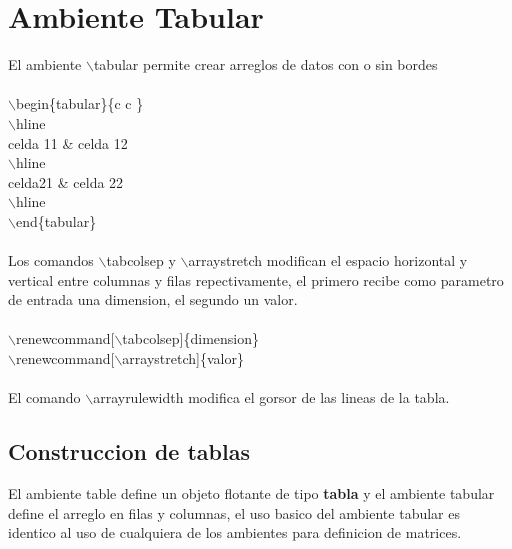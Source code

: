 \documentclass{article}
\begin{document}
	\section{Ambiente Tabular}
	
	El ambiente \textcolor{myGreen}{$\backslash$tabular} permite crear arreglos de datos con o sin bordes\\\\
	\textcolor{myGreen}{$\backslash$begin}\{tabular\}\{\textbar c \textbar c \textbar\}\\\textcolor{myGreen}{$\backslash$hline}\\
	celda 11 \& celda 12\\
	\textcolor{myGreen}{$\backslash$hline}\\
	celda21 \& celda 22\\
	\textcolor{myGreen}{$\backslash$hline}\\
	\textcolor{myGreen}{$\backslash$end}\{tabular\}\\\\
	Los comandos \textcolor{myGreen}{$\backslash$tabcolsep} y \textcolor{myGreen}{$\backslash$arraystretch} modifican el espacio horizontal y vertical entre columnas y filas repectivamente, el primero recibe como parametro de entrada una dimension, el segundo un valor.\\\\
	\textcolor{myGreen}{$\backslash$renewcommand}[$\backslash$tabcolsep]\{dimension\}\\\textcolor{myGreen}{$\backslash$renewcommand}[$\backslash$arraystretch]\{valor\}\\\\
	El comando \textcolor{myGreen}{$\backslash$arrayrulewidth} modifica el gorsor de las lineas de la tabla.
	
	
	\subsection{Construccion de tablas}
	El ambiente \textcolor{myGreen}{table} define un objeto flotante de tipo \textbf{tabla} y el ambiente \textcolor{myGreen}{tabular} define el arreglo en filas y columnas, el uso basico del ambiente \textcolor{myGreen}{tabular} es identico al uso de cualquiera de los ambientes para definicion de matrices.
	
	
	\renewcommand{\tabcolsep}{10pt}
	
	\renewcommand{\arraystretch}{1.5}
	
\end{document}
